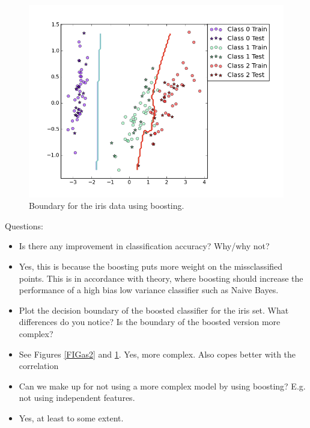 \documentclass[a4paper,10pt]{article}
\begin{document}
\FloatBarrier
\begin{figure}[h!]
  \center
  \includegraphics[width = 150mm]{figure_3.png}
  \vspace{-15mm}

  \begin{minipage}[t]{95mm}
    \caption{
      Boundary for the iris data using boosting.
    }
    \label{FIGas3}
  \end{minipage}
\end{figure}
\FloatBarrier

\newpage
\noindent
Questions:
\begin{itemize}
  \item[1)] Is there any improvement in classification accuracy? Why/why not?
  \item[A:] Yes, this is because the boosting puts more weight on the
    missclassified points. This is in accordance with theory, where boosting
    should increase the performance of a high bias low variance classifier
    such as Naive Bayes.
  \item[2)] Plot the decision boundary of the boosted classifier for the iris set.
    What differences do you notice? Is the boundary of the boosted version more
    complex?
  \item[A:] See Figures \ref{FIGas2} and \ref{FIGas3}. Yes, more complex. Also copes better
    with the correlation
  \item[3)] Can we make up for not using a more complex model by using boosting?
    E.g. not using independent features.
  \item[A:] Yes, at least to some extent.
\end{itemize}
\end{document}

